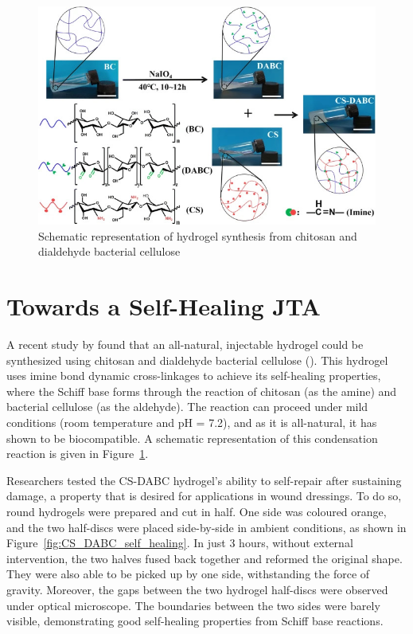 \begin{figure}[hb]
    \centering 
    \includegraphics[width=0.7\linewidth]{Figures/CS_DABC_condensation.jpg}
    \caption{Schematic representation of hydrogel synthesis from chitosan and dialdehyde bacterial cellulose \autocite{liAllnaturalInjectableHydrogel2020}}
    \label{fig:CS_DABC_condensation}
\end{figure}

\section{Towards a Self-Healing JTA}

A recent study by \citeauthor{liAllnaturalInjectableHydrogel2020} found that an all-natural, injectable hydrogel could be synthesized using chitosan and dialdehyde bacterial cellulose (\citeyear{liAllnaturalInjectableHydrogel2020}). This hydrogel uses imine bond dynamic cross-linkages to achieve its self-healing properties, where the Schiff base forms through the reaction of chitosan (as the amine) and bacterial cellulose (as the aldehyde).
The reaction can proceed under mild conditions (room temperature and pH = 7.2), and as it is all-natural, it has shown to be biocompatible. A schematic representation of this condensation reaction is given in Figure~\ref{fig:CS_DABC_condensation}.

Researchers tested the CS-DABC hydrogel's ability to self-repair after sustaining damage, a property that is desired for applications in wound dressings. To do so, round hydrogels were prepared and cut in half. One side was coloured orange, and the two half-discs were placed side-by-side in ambient conditions, as shown in Figure~\ref{fig:CS_DABC_self_healing}.
In just 3 hours, without external intervention, the two halves fused back together and reformed the original shape. They were also able to be picked up by one side, withstanding the force of gravity. Moreover, the gaps between the two hydrogel half-discs were observed under optical microscope.
The boundaries between the two sides were barely visible, demonstrating good self-healing properties from Schiff base reactions.

